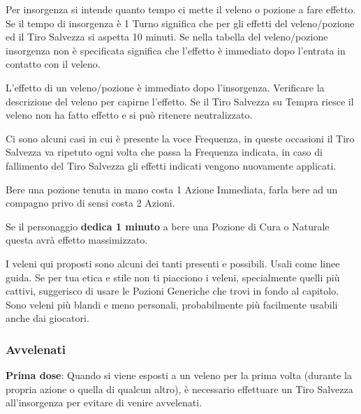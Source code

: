 \begin{multicols}{2}
Per insorgenza si intende quanto tempo ci mette il veleno o pozione a fare effetto. Se il tempo di insorgenza è 1 Turno significa che per gli effetti del veleno/pozione ed il Tiro Salvezza si aspetta 10 minuti. Se nella tabella del veleno/pozione insorgenza non è specificata significa che l'effetto è immediato dopo l'entrata in contatto con il veleno.

L'effetto di un veleno/pozione è immediato dopo l'insorgenza. Verificare la descrizione del veleno per capirne l'effetto. Se il Tiro Salvezza su Tempra riesce il veleno non ha fatto effetto e si può ritenere neutralizzato. 

Ci sono alcuni casi in cui è presente la voce Frequenza, in queste occasioni il Tiro Salvezza va ripetuto ogni volta che passa la Frequenza indicata, in caso di fallimento del Tiro Salvezza gli effetti indicati vengono nuovamente applicati.

Bere una pozione tenuta in mano costa 1 Azione Immediata, farla bere ad un compagno privo di sensi costa 2 Azioni.

Se il personaggio \textbf{dedica 1 minuto} a bere una Pozione di Cura o Naturale questa avrà effetto massimizzato.


\begin{changemargin}{0.3cm}{0.3cm}\begin{narratore}
I veleni qui proposti sono alcuni dei tanti presenti e possibili. Usali come linee guida. Se per tua etica e stile non ti piacciono i veleni, specialmente quelli più cattivi, suggerisco di usare le Pozioni Generiche che trovi in fondo al capitolo. Sono veleni più blandi e meno personali, probabilmente più facilmente usabili anche dai giocatori.
\end{narratore}\end{changemargin}

\subsubsection{Avvelenati}\label{avvelenato}

\textbf{Prima dose}: Quando si viene esposti a un veleno per la prima volta (durante la propria azione o quella di qualcun altro), è necessario effettuare un Tiro Salvezza all'insorgenza per evitare di venire avvelenati.


\end{multicols}
